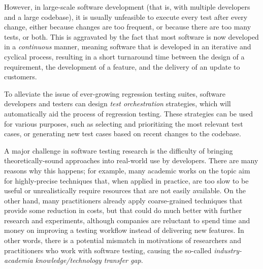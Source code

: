 However, in large-scale software development (that is, with multiple developers and a large codebase), it is usually unfeasible to execute every test after every change, either because changes are too frequent, or because there are too many tests, or both.
This is aggravated by the fact that most software is now developed in a \textit{continuous} manner, meaning software that is developed in an iterative and cyclical process, resulting in a short turnaround time between the design of a requirement, the development of a feature, and the delivery of an update to customers.

To alleviate the issue of ever-growing regression testing suites, software developers and testers can design \textit{test orchestration} strategies, which will automatically aid the process of regression testing.
These strategies can be used for various purposes, such as selecting and prioritizing the most relevant test cases, or generating new test cases based on recent changes to the codebase.

A major challenge in software testing research is the difficulty of bringing theoretically-sound approaches into real-world use by developers.
There are many reasons why this happens; for example, many academic works on the topic aim for highly-precise techniques that, when applied in practice, are too slow to be useful or unrealistically require resources that are not easily available.
On the other hand, many practitioners already apply coarse-grained techniques that provide some reduction in costs, but that could do much better with further research and experiments, although companies are reluctant to spend time and money on improving a testing workflow instead of delivering new features.
In other words, there is a potential mismatch in motivations of researchers and practitioners who work with software testing, causing the so-called \textit{industry-academia knowledge/technology transfer gap}.


